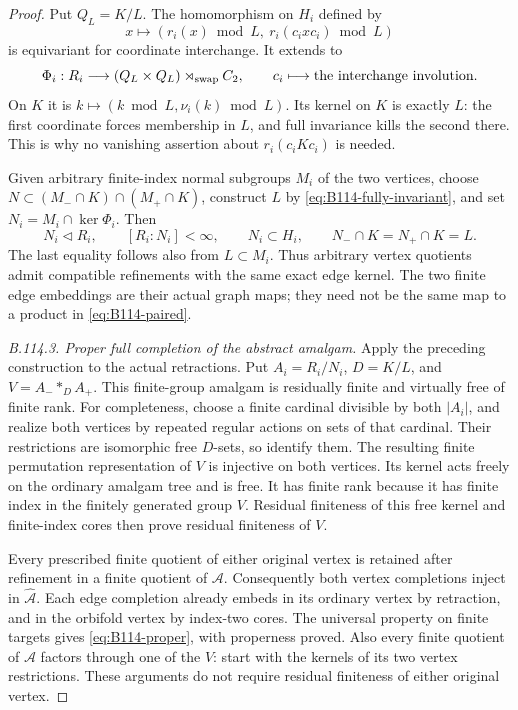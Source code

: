 \begin{proof}
Put $Q_L=K/L$. The homomorphism on $H_i$ defined by
\[
 x\longmapsto(r_i(x)\bmod L,\ r_i(c_i x c_i)\bmod L)
\]
is equivariant for coordinate interchange. It extends to
\begin{equation}\label{eq:B114-paired}
 \Phi_i:R_i\longrightarrow
 (Q_L\times Q_L)\rtimes_{\rm swap}C_2,
 \qquad c_i\longmapsto\text{the interchange involution}.
\end{equation}
On $K$ it is $k\mapsto(k\bmod L,\nu_i(k)\bmod L)$.
Its kernel on $K$ is exactly $L$: the first coordinate forces
membership in $L$, and full invariance kills the second there.
This is why no vanishing assertion about $r_i(c_i Kc_i)$ is needed.

Given arbitrary finite-index normal subgroups $M_i$ of the two
vertices, choose $N\subset(M_-\cap K)\cap(M_+\cap K)$, construct
$L$ by \eqref{eq:B114-fully-invariant}, and set
$N_i=M_i\cap\ker\Phi_i$. Then
\[
 N_i\triangleleft R_i,
 \qquad [R_i:N_i]<\infty,
 \qquad N_i\subset H_i,
 \qquad N_-\cap K=N_+\cap K=L.
\]
The last equality follows also from $L\subset M_i$.
Thus arbitrary vertex quotients admit compatible refinements with
the same exact edge kernel. The two finite edge embeddings are
their actual graph maps; they need not be the same map to a
product in \eqref{eq:B114-paired}.

\emph{B.114.3. Proper full completion of the abstract amalgam.}
Apply the preceding construction to the actual retractions. Put
$A_i=R_i/N_i$, $D=K/L$, and $V=A_-*_{D}A_+$.
This finite-group amalgam is residually finite and virtually free
of finite rank. For completeness, choose a finite cardinal
divisible by both $|A_i|$, and realize both vertices by repeated
regular actions on sets of that cardinal. Their restrictions are
isomorphic free $D$-sets, so identify them. The resulting finite
permutation representation of $V$ is injective on both vertices.
Its kernel acts freely on the ordinary amalgam tree and is free.
It has finite rank because it has finite index in the finitely
generated group $V$. Residual finiteness of this free kernel and
finite-index cores then prove residual finiteness of $V$.

Every prescribed finite quotient of either original vertex is
retained after refinement in a finite quotient of $\mathcal A$.
Consequently both vertex completions inject in
$\widehat{\mathcal A}$. Each edge completion already embeds in
its ordinary vertex by retraction, and in the orbifold vertex by
index-two cores. The universal property on finite targets gives
\eqref{eq:B114-proper}, with properness proved. Also every finite
quotient of $\mathcal A$ factors through one of the $V$: start
with the kernels of its two vertex restrictions. These arguments
do not require residual finiteness of either original vertex.


\end{proof}

